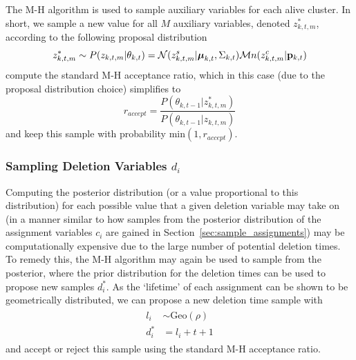 \documentclass[smallcondensed, final]{svjour3}
\begin{document}
The M-H algorithm is used to sample auxiliary variables for each alive cluster. In short, we sample a new value for all $M$ auxiliary variables, denoted $z_{k,t,m}^{*}$, according to the following proposal distribution
\begin{equation}
\label{proposal_distro}
z_{k,t,m}^{*}  \sim  P(z_{k,t,m} | \theta_{k,t}) = \mathcal{N}(z_{k,t,m}^{s} | \boldsymbol{\mu}_{k,t}, \Sigma_{k,t}) \mathcal{M}n(z_{k,t,m}^{c} | \bold{p}_{k,t})
\end{equation}
compute the standard M-H acceptance ratio, which in this case (due to the proposal distribution choice) simplifies to 
\begin{equation}
\label{accept_ratio}
r_{accept} = \frac{P(\theta_{k,t-1} | z_{k,t,m}^{*})}{P(\theta_{k,t-1} | z_{k,t,m})}
\end{equation}
and keep this sample with probability $\text{min}(1, r_{accept})$.






\subsubsection{Sampling Deletion Variables $d_{i}$}
Computing the posterior distribution (or a value proportional to this distribution) for each possible value that a given deletion variable may take on (in a manner similar to how samples from the posterior distribution of the assignment variables $c_{i}$ are gained in Section~\ref{sec:sample_assignments}) may be computationally expensive due to the large number of potential deletion times. To remedy this, the M-H algorithm may again be used to sample from the posterior, where the prior distribution for the deletion times can be used to propose new samples $d_{i}^{*}$. As the `lifetime' of each assignment can be shown to be geometrically distributed, we can propose a new deletion time sample with
\begin{align}
\begin{split}
l_{i}  &\sim  \text{Geo}(\rho)  \\
d_{i}^{*}  &= l_{i} + t + 1
\end{split}
\end{align}
and accept or reject this sample using the standard M-H acceptance ratio. 

\end{document}
